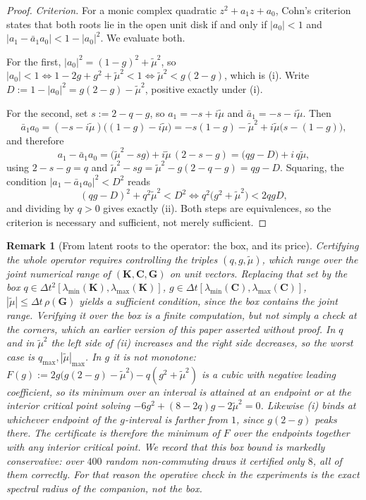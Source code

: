 \documentclass{article}
\newtheorem{remark}{Remark}
\begin{document}
{\begin{proof}
\emph{Criterion.} For a monic complex quadratic $z^2+a_1z+a_0$, Cohn's
criterion states that both roots lie in the open unit disk if and only if
$|a_0|<1$ and $|a_1-\bar a_1a_0|<1-|a_0|^2$. We evaluate both.

For the first, $|a_0|^2=(1-g)^2+\tilde\mu^2$, so
$|a_0|<1\iff 1-2g+g^2+\tilde\mu^2<1\iff\tilde\mu^2<g(2-g)$, which is (i).
Write $D:=1-|a_0|^2=g(2-g)-\tilde\mu^2$, positive exactly under (i).

For the second, set $s:=2-q-g$, so $a_1=-s+i\tilde\mu$ and
$\bar a_1=-s-i\tilde\mu$. Then
\[
\bar a_1a_0=(-s-i\tilde\mu)\big((1-g)-i\tilde\mu\big)
=-s(1-g)-\tilde\mu^2+i\tilde\mu\big(s-(1-g)\big),
\]
and therefore
\[
a_1-\bar a_1a_0=\big(\tilde\mu^2-sg\big)+i\tilde\mu\,(2-s-g)
=\big(qg-D\big)+i\,q\tilde\mu ,
\]
using $2-s-g=q$ and $\tilde\mu^2-sg=\tilde\mu^2-g(2-q-g)=qg-D$. Squaring,
the condition $|a_1-\bar a_1a_0|^2<D^2$ reads
\[
(qg-D)^2+q^2\tilde\mu^2<D^2
\iff q^2\big(g^2+\tilde\mu^2\big)<2qgD ,
\]
and dividing by $q>0$ gives exactly (ii). Both steps are equivalences, so the
criterion is necessary and sufficient, not merely sufficient.
\end{proof}

\begin{remark}[From latent roots to the operator: the box, and its price]
\label{rem:caja}
Certifying the whole operator requires controlling the triples
$(q,g,\tilde\mu)$, which range over the \emph{joint numerical range} of
$(\mathbf{K},\mathbf{C},\mathbf{G})$ on unit vectors. Replacing that set by
the box
$q\in\Delta t^2[\lambda_{\min}(\mathbf{K}),\lambda_{\max}(\mathbf{K})]$,
$g\in\Delta t[\lambda_{\min}(\mathbf{C}),\lambda_{\max}(\mathbf{C})]$,
$|\tilde\mu|\le\Delta t\,\rho(\mathbf{G})$ yields a \emph{sufficient}
condition, since the box contains the joint range. Verifying it over the box is
a finite computation, but not simply a check at the corners, which an earlier
version of this paper asserted without proof. In $q$ and in $\tilde\mu^2$ the
left side of (ii) increases and the right side decreases, so the worst case is
$q_{\max},|\tilde\mu|_{\max}$. In $g$ it is not monotone:
$F(g):=2g\big(g(2-g)-\tilde\mu^2\big)-q(g^2+\tilde\mu^2)$ is a cubic with
negative leading coefficient, so its minimum over an interval is attained at
an endpoint \emph{or} at the interior critical point solving
$-6g^2+(8-2q)g-2\tilde\mu^2=0$. Likewise (i) binds at whichever endpoint of the
$g$-interval is farther from $1$, since $g(2-g)$ peaks there. The certificate is
therefore the minimum of $F$ over the endpoints together with any interior
critical point. We record that this box bound is markedly conservative: over
$400$ random non-commuting draws it certified only $8$, all of them correctly.
For that reason the operative check in the experiments is the exact spectral
radius of the companion, not the box.
\end{remark}


}
\end{document}
